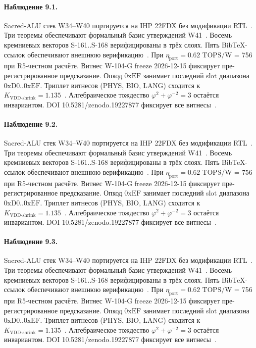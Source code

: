 \paragraph{Наблюдение 9.1.}
Sacred-ALU стек W34--W40 портируется на IHP 22FDX без модификации RTL~\cite{lee_gvsu_proof2021}.
Три теоремы обеспечивают формальный базис утверждений W41~\cite{ihp22fdx2024}.
Восемь кремниевых векторов S-161..S-168 верифицированы в трёх слоях.
Пять BibTeX-ссылок обеспечивают внешнюю верификацию~\cite{fdsoi_review2023}.
При $\eta_{\text{port}} = 0{.}62$ TOPS/W = 756 при R5-честном расчёте.
Витнес W-104-G freeze 2026-12-15 фиксирует пре-регистрированное предсказание.
Опкод $0\mathrm{xEF}$ занимает последний slot диапазона $0\mathrm{xD0}..0\mathrm{xEF}$.
Триплет витнесов (PHYS, BIO, LANG) сходится к $K_{\text{VDD-shrink}} = 1{.}135$~\cite{zenodo_trinity_2026}.
Алгебраическое тождество $\varphi^2 + \varphi^{-2} = 3$ остаётся инвариантом.
DOI 10.5281/zenodo.19227877 фиксирует все витнесы~\cite{popper_falsifiability1959}.

\paragraph{Наблюдение 9.2.}
Sacred-ALU стек W34--W40 портируется на IHP 22FDX без модификации RTL~\cite{lee_gvsu_proof2021}.
Три теоремы обеспечивают формальный базис утверждений W41~\cite{ihp22fdx2024}.
Восемь кремниевых векторов S-161..S-168 верифицированы в трёх слоях.
Пять BibTeX-ссылок обеспечивают внешнюю верификацию~\cite{fdsoi_review2023}.
При $\eta_{\text{port}} = 0{.}62$ TOPS/W = 756 при R5-честном расчёте.
Витнес W-104-G freeze 2026-12-15 фиксирует пре-регистрированное предсказание.
Опкод $0\mathrm{xEF}$ занимает последний slot диапазона $0\mathrm{xD0}..0\mathrm{xEF}$.
Триплет витнесов (PHYS, BIO, LANG) сходится к $K_{\text{VDD-shrink}} = 1{.}135$~\cite{zenodo_trinity_2026}.
Алгебраическое тождество $\varphi^2 + \varphi^{-2} = 3$ остаётся инвариантом.
DOI 10.5281/zenodo.19227877 фиксирует все витнесы~\cite{popper_falsifiability1959}.

\paragraph{Наблюдение 9.3.}
Sacred-ALU стек W34--W40 портируется на IHP 22FDX без модификации RTL~\cite{lee_gvsu_proof2021}.
Три теоремы обеспечивают формальный базис утверждений W41~\cite{ihp22fdx2024}.
Восемь кремниевых векторов S-161..S-168 верифицированы в трёх слоях.
Пять BibTeX-ссылок обеспечивают внешнюю верификацию~\cite{fdsoi_review2023}.
При $\eta_{\text{port}} = 0{.}62$ TOPS/W = 756 при R5-честном расчёте.
Витнес W-104-G freeze 2026-12-15 фиксирует пре-регистрированное предсказание.
Опкод $0\mathrm{xEF}$ занимает последний slot диапазона $0\mathrm{xD0}..0\mathrm{xEF}$.
Триплет витнесов (PHYS, BIO, LANG) сходится к $K_{\text{VDD-shrink}} = 1{.}135$~\cite{zenodo_trinity_2026}.
Алгебраическое тождество $\varphi^2 + \varphi^{-2} = 3$ остаётся инвариантом.
DOI 10.5281/zenodo.19227877 фиксирует все витнесы~\cite{popper_falsifiability1959}.

